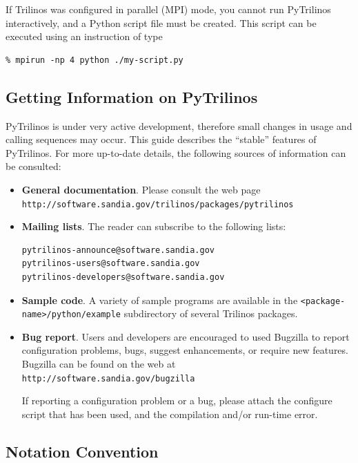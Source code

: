 \documentclass[10pt,relax]{SANDreport}
\newcommand{\PyTrilinos}{{PyTrilinos}}
\begin{document}
If Trilinos was configured in parallel (MPI) mode, you cannot run PyTrilinos
interactively, and a Python script file must be created. This script can be
executed using an instruction of type
\begin{verbatim}
% mpirun -np 4 python ./my-script.py
\end{verbatim}

\subsection{Getting Information on \PyTrilinos}

PyTrilinos is under very active development, therefore small changes in usage
and calling sequences may occur. This
guide describes the ``stable'' features of PyTrilinos. For more up-to-date
details, the following sources of information can be consulted:
\begin{itemize}
\item {\bf General documentation}.
Please consult the web page \\
  \verb!http://software.sandia.gov/trilinos/packages/pytrilinos!
\item {\bf Mailing lists}. The reader can subscribe to the following lists:
\begin{verbatim}
pytrilinos-announce@software.sandia.gov
pytrilinos-users@software.sandia.gov
pytrilinos-developers@software.sandia.gov
\end{verbatim}
\item {\bf Sample code}. A variety of sample programs are available in the
\verb!<package-name>/python/example! subdirectory of several Trilinos
packages.
\item {\bf Bug report}.
Users and developers are encouraged to used Bugzilla to report
configuration problems, bugs, suggest enhancements, or require new features.
Bugzilla can be found on the web at\\
  \verb!http://software.sandia.gov/bugzilla!

If reporting a configuration problem or a bug, please attach the configure
script that has been used, and the compilation and/or run-time error.
\end{itemize}

\subsection{Notation Convention}
\end{document}
